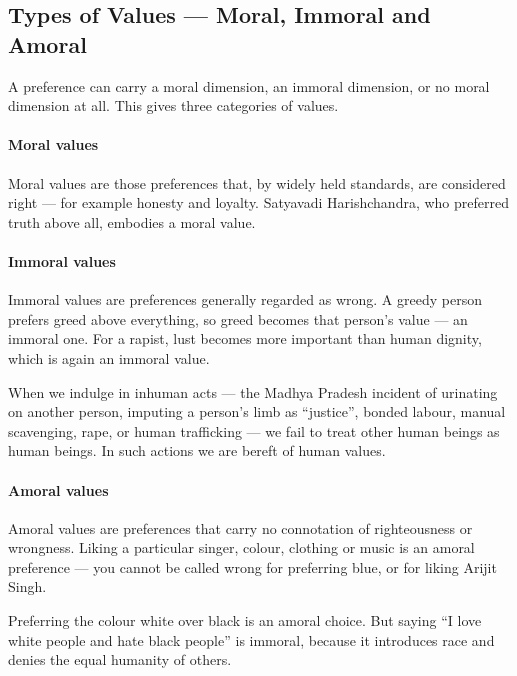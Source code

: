 \subsection{Types of Values --- Moral, Immoral and Amoral}

A preference can carry a moral dimension, an immoral dimension, or no moral dimension at all. This gives three categories of values.

\paragraph{Moral values} Moral values are those preferences that, by widely held standards, are considered right --- for example honesty and loyalty. Satyavadi Harishchandra, who preferred truth above all, embodies a moral value.

\paragraph{Immoral values} Immoral values are preferences generally regarded as wrong. A greedy person prefers greed above everything, so greed becomes that person's value --- an immoral one. For a rapist, lust becomes more important than human dignity, which is again an immoral value.

\begin{CriticalPoint}
When we indulge in inhuman acts --- the Madhya Pradesh incident of urinating on another person, imputing a person's limb as ``justice'', bonded labour, manual scavenging, rape, or human trafficking --- we fail to treat other human beings as human beings. In such actions we are bereft of human values.
\end{CriticalPoint}

\paragraph{Amoral values} Amoral values are preferences that carry no connotation of righteousness or wrongness. Liking a particular singer, colour, clothing or music is an amoral preference --- you cannot be called wrong for preferring blue, or for liking Arijit Singh.

\begin{ExampleBox}
Preferring the colour white over black is an amoral choice. But saying ``I love white people and hate black people'' is immoral, because it introduces race and denies the equal humanity of others.
\end{ExampleBox}

